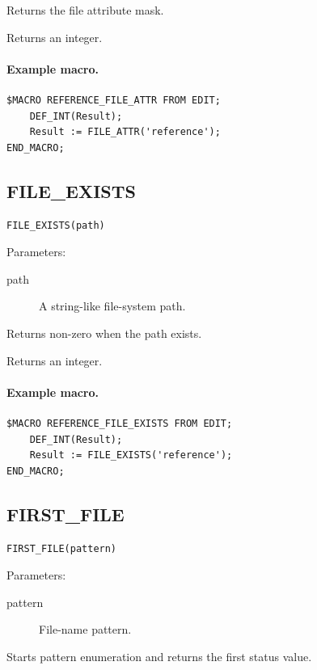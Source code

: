 \documentclass[a4paper,10pt,twoside,openany]{book}
\begin{document}
Returns the file attribute mask.

Returns an integer.

\paragraph{Example macro.}
\begin{verbatim}
$MACRO REFERENCE_FILE_ATTR FROM EDIT;
    DEF_INT(Result);
    Result := FILE_ATTR('reference');
END_MACRO;
\end{verbatim}

\label{prim:intrinsic-file-exists}
\subsection*{FILE\_EXISTS}
\begin{verbatim}
FILE_EXISTS(path)
\end{verbatim}
Parameters:
\begin{description}
\item[path] A string-like file-system path.
\end{description}

Returns non-zero when the path exists.

Returns an integer.

\paragraph{Example macro.}
\begin{verbatim}
$MACRO REFERENCE_FILE_EXISTS FROM EDIT;
    DEF_INT(Result);
    Result := FILE_EXISTS('reference');
END_MACRO;
\end{verbatim}

\label{prim:intrinsic-first-file}
\subsection*{FIRST\_FILE}
\begin{verbatim}
FIRST_FILE(pattern)
\end{verbatim}
Parameters:
\begin{description}
\item[pattern] File-name pattern.
\end{description}

Starts pattern enumeration and returns the first status value.
\end{document}
